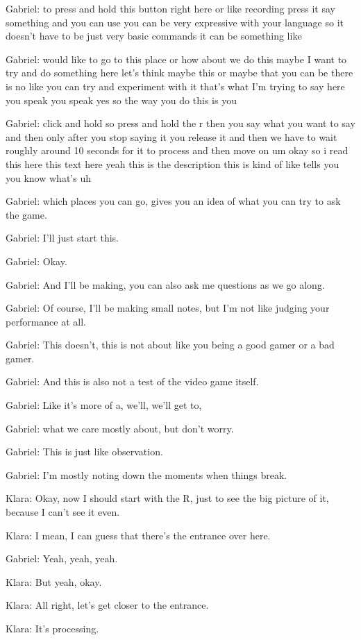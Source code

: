 Gabriel: to press and hold this button right here or like recording press it say something and you can use you can be very expressive with your language so it doesn't have to be just very basic commands it can be something like

Gabriel: would like to go to this place or how about we do this maybe I want to try and do something here let's think maybe this or maybe that you can be there is no like you can try and experiment with it that's what I'm trying to say here you speak you speak yes so the way you do this is you

Gabriel: click and hold so press and hold the r then you say what you want to say and then only after you stop saying it you release it and then we have to wait roughly around 10 seconds for it to process and then move on um okay so i read this here this text here yeah this is the description this is kind of like tells you you know what's uh

Gabriel: which places you can go, gives you an idea of what you can try to ask the game.

Gabriel: I'll just start this.

Gabriel: Okay.

Gabriel: And I'll be making, you can also ask me questions as we go along.

Gabriel: Of course, I'll be making small notes, but I'm not like judging your performance at all.

Gabriel: This doesn't, this is not about like you being a good gamer or a bad gamer.

Gabriel: And this is also not a test of the video game itself.

Gabriel: Like it's more of a, we'll, we'll get to,

Gabriel: what we care mostly about, but don't worry.

Gabriel: This is just like observation.

Gabriel: I'm mostly noting down the moments when things break.

Klara: Okay, now I should start with the R, just to see the big picture of it, because I can't see it even.

Klara: I mean, I can guess that there's the entrance over here.

Gabriel: Yeah, yeah, yeah.

Klara: But yeah, okay.

Klara: All right, let's get closer to the entrance.

Klara: It's processing.

